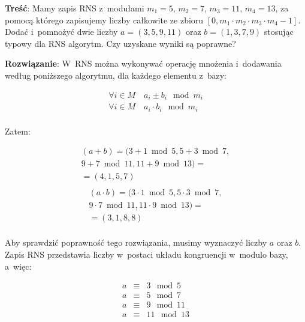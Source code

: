 \documentclass[a4paper,10pt, twocolumn]{article}
\begin{document}
\textbf{Treść}: Mamy zapis RNS z~modułami $m_{1} = 5$, $m_{2} = 7$, $m_{3} = 11$, $m_{4} = 13$, za pomocą którego zapisujemy liczby całkowite ze zbioru $[0, m_{1} \cdot m_{2} \cdot m_{3} \cdot m_{4} - 1]$. Dodać i~pomnożyć dwie liczby $a = (3, 5, 9, 11)$ oraz $b = (1, 3, 7, 9)$ stosując typowy dla RNS algorytm. Czy uzyskane wyniki są poprawne?

\textbf{Rozwiązanie}: W~RNS można wykonywać operację mnożenia i~dodawania według poniższego algorytmu, dla każdego elementu z~bazy:

\begin{equation*}
 \begin{array}{l} \forall i \in M \quad a_{i} \pm b_{i} \mod m_{i} \\ \forall i \in M \quad a_{i} \cdot b_{i} \mod m_{i} \\ \end{array}
\end{equation*}

\noindent Zatem:

\begin{equation*}
 \begin{array}{c}(a + b) = (3 + 1 \bmod{5}, 5 + 3 \bmod{7}, \\ 9 + 7 \bmod{11}, 11 + 9 \bmod{13}) = \\ =  (4, 1, 5, 7) \\ \end{array}
\end{equation*}
\begin{equation*}
 \begin{array}{c}(a \cdot b) = (3 \cdot 1 \bmod{5}, 5 \cdot 3 \bmod{7}, \\ 9 \cdot 7 \bmod{11}, 11 \cdot 9 \bmod{13}) = \\ =  (3, 1, 8, 8) \\ \end{array}
\end{equation*}

\noindent Aby sprawdzić poprawność tego rozwiązania, musimy wyznaczyć liczby $a$ oraz $b$. Zapis RNS przedstawia liczby w~postaci układu kongruencji w~modulo bazy, a~więc:

\begin{equation*}
 \begin{array}{lcl}a & \equiv & 3 \mod 5 \\ a & \equiv & 5 \mod 7 \\ a & \equiv & 9 \mod 11 \\ a & \equiv & 11 \mod 13 \\ \end{array}
\end{equation*}
\end{document}
